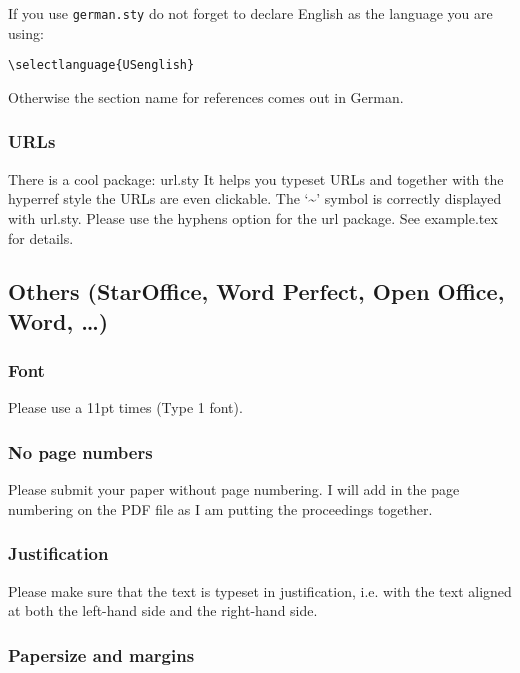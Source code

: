 \documentclass[11pt,a4paper,fleqn]{article}
\begin{document}
If you use \verb+german.sty+ do not forget to declare English as the language
you are using:
\begin{verbatim}
\selectlanguage{USenglish}
\end{verbatim}
Otherwise the section name for references comes out in German.

\subsubsection{URLs}

There is a cool package: url.sty It helps you typeset URLs and together with the hyperref style the
URLs are even clickable. The `\~{}' symbol is correctly displayed with url.sty. Please use the
hyphens option for the url package. See example.tex for details.





\subsection{Others (StarOffice, Word Perfect, Open Office, Word, \ldots)}

\subsubsection{Font}

Please use a 11pt times (Type 1 font). 

\subsubsection{No page numbers}

Please submit your paper without page numbering.  I will add in
the page numbering on the PDF file as I am putting the
proceedings together.

\subsubsection{Justification}

Please make sure that the text is typeset in justification,
i.e. with the text aligned at both the left-hand side and the right-hand side.

\subsubsection{Papersize and margins}
\label{margins}
\end{document}
